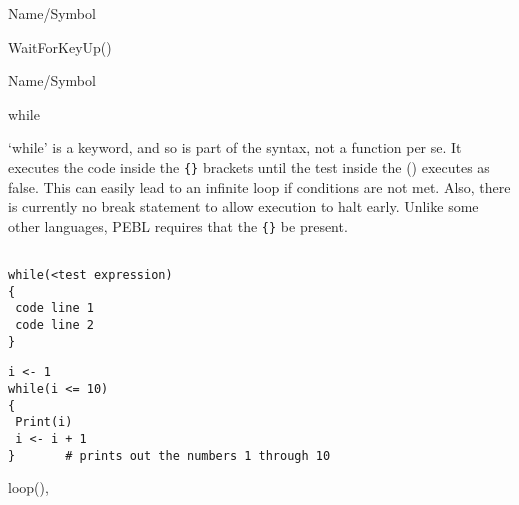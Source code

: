 \rl


\begin{desc}{Name/Symbol}
\item[Name/Symbol] 	WaitForKeyUp()

\item[Description]	

\item[Usage]		

\item[Example]	

\item[See Also]	
\end{desc}

\rl


\begin{desc}{Name/Symbol}
\item[Name/Symbol]	while

\item[Description] 	`while' is a keyword, and so is part of the syntax, not a 
		function per se.  It executes the code inside the \verb+{}+ brackets 
		until the test inside the () executes as false.  This can 
		easily lead to an infinite loop if conditions are not met.  
		Also, there is currently no break statement to allow execution 
		to halt early.  Unlike some other languages, PEBL requires 
		that the \verb+{}+ be present.

\item[Usage]
\begin{verbatim}

while(<test expression)
{
 code line 1
 code line 2
}
\end{verbatim}

\item[Example] 
\begin{verbatim}
i <- 1
while(i <= 10)
{
 Print(i)
 i <- i + 1
}		# prints out the numbers 1 through 10
\end{verbatim}

\item[See Also] 	loop(), {}


\end{desc}

\rl




